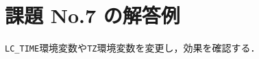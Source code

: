 \documentclass[a4j,twcolumn,11pt,nomag]{ltjarticle}      %
\begin{document}
\onecolumn

\section*{課題 No.7 の解答例}
\texttt{LC\_TIME}環境変数や\texttt{TZ}環境変数を変更し，効果を確認する．
\end{document}
